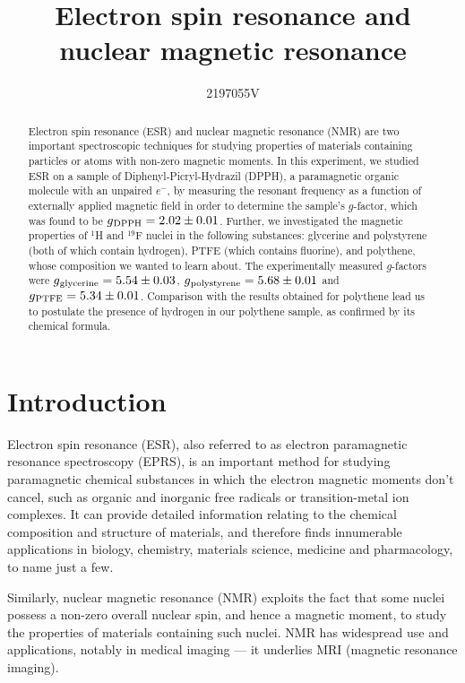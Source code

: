 \documentclass[a4paper]{jpconf}
\numberwithin{equation}{section}
\begin{document}
\title{Electron spin resonance and nuclear magnetic resonance}

\author{2197055V}


\begin{abstract}
Electron spin resonance (ESR) and nuclear magnetic resonance (NMR) are two important spectroscopic techniques for studying properties of materials containing particles or atoms with non-zero magnetic moments. In this experiment, we studied ESR on a sample of Diphenyl-Picryl-Hydrazil (DPPH), a paramagnetic organic molecule with an unpaired $e^-$, by measuring the resonant frequency as a function of externally applied magnetic field in order to determine the sample\textquoteright s $g$-factor, which was found to be $g\textsubscript{DPPH} = 2.02 \pm 0.01$.
Further, we investigated the magnetic properties of ${}^1$H and ${}^{19}$F nuclei in the following substances: glycerine and polystyrene (both of which contain hydrogen), PTFE (which contains fluorine), and polythene, whose composition we wanted to learn about. The experimentally measured $g$-factors were $g\textsubscript{glycerine} = 5.54 \pm 0.03$, $g\textsubscript{polystyrene} = 5.68 \pm 0.01$ and $g\textsubscript{PTFE} = 5.34 \pm 0.01$. Comparison with the results obtained for polythene lead us to postulate the presence of hydrogen in our polythene sample, as confirmed by its chemical formula.

\end{abstract}

\section{Introduction}
Electron spin resonance (ESR), also referred to as electron paramagnetic resonance spectroscopy      %
(EPRS), is an important method for studying paramagnetic chemical substances in which the electron magnetic moments don't cancel, such as organic and inorganic free radicals or transition-metal ion complexes. It can provide detailed information relating to the chemical composition and structure of materials, and therefore finds innumerable applications in biology, chemistry, materials science, medicine and pharmacology, to name just a few.

Similarly, nuclear magnetic resonance (NMR) exploits the fact that some nuclei possess a non-zero overall nuclear spin, and hence a magnetic moment, to study the properties of materials containing such nuclei. NMR has widespread use and applications, notably in medical imaging --- it underlies MRI (magnetic resonance imaging).
\end{document}
